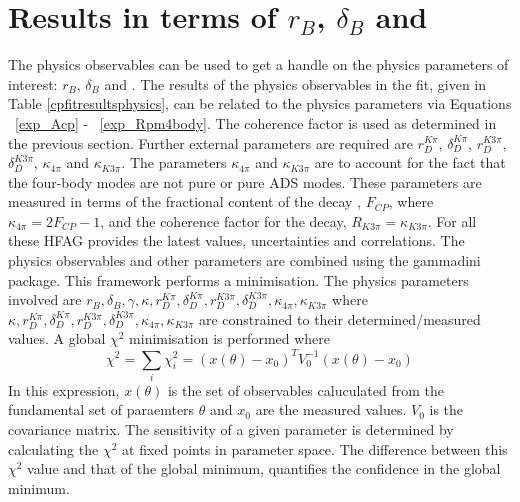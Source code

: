 \section{Results in terms of $r_B$, $\delta_B$ and \Pgamma}
\label{sec:interpretation:gammadini}

The physics observables can be used to get a handle on the physics parameters of interest: $r_B$, $\delta_B$ and \Pgamma. 
The results of the physics observables in the \CP fit, given in Table \ref{cpfitresultsphysics}, can be related to the physics parameters via Equations ~\ref{exp_Acp} - ~\ref{exp_Rpm4body}. The coherence factor is used as determined in the previous section. Further external parameters are required are $r_D^{K\pi}$, $\delta_D^{K\pi}$, $r_D^{K3\pi}$, $\delta_D^{K3\pi}$, $\kappa_{4\pi}$ and $\kappa_{K3\pi}$. The parameters $\kappa_{4\pi}$ and $\kappa_{K3\pi}$ are to account for the fact that the four-body modes are not pure \CP or pure ADS modes. These parameters are measured in terms of the fractional \CP content of the decay \decay{\Dz}{\pip\pim\pip\pim}, $F_{CP}$, where $\kappa_{4\pi} = 2F_{CP} - 1$, and the coherence factor for the \decay{\Dz}{\Km\pip\pim\pip} decay, $R_{K3\pi} = \kappa_{K3\pi}$. For all these HFAG provides the latest values, uncertainties and correlations.
The physics observables and other parameters are combined using the gammadini package. This framework performs a minimisation. The physics parameters involved are $r_B, \delta_B, \gamma, \kappa, r_D^{K\pi}, \delta_D^{K\pi}, r_D^{K3\pi}, \delta_D^{K3\pi}, \kappa_{4\pi}, \kappa_{K3\pi}$ where $\kappa, r_D^{K\pi}, \delta_D^{K\pi}, r_D^{K3\pi}, \delta_D^{K3\pi}, \kappa_{4\pi}, \kappa_{K3\pi}$ are constrained to their determined/measured values. 
A global $\chi^2$ minimisation is performed where
\begin{equation}
\chi^2 = \sum_i \chi^2_i = (x(\theta) - x_0)^TV_0^{-1}(x(\theta)-x_0)
\end{equation}
In this expression, $x(\theta)$ is the set of observables caluculated from the fundamental set of paraemters $\theta$ and $x_0$ are the measured values. $V_0$ is the covariance matrix.
The sensitivity of a given parameter is determined by calculating the $\chi^2$ at fixed points in parameter space. The difference between this $\chi^2$ value and that of the global minimum, quantifies the confidence in the global minimum. 

